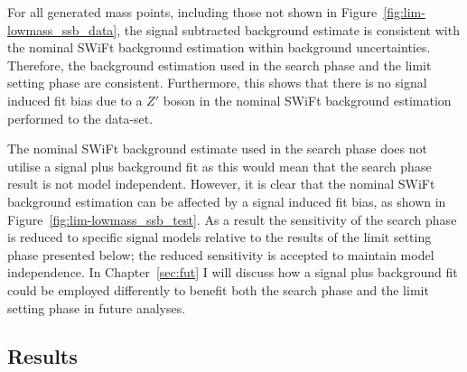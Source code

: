 For all generated mass points, including those not shown in Figure~\ref{fig:lim-lowmass_ssb_data},
the signal subtracted background estimate is consistent with the nominal SWiFt background estimation
within background uncertainties.
Therefore, the background estimation used in the search phase and the limit setting phase are consistent.
Furthermore, this shows that there is no signal induced fit bias due to a $Z'$ boson
in the nominal SWiFt background estimation performed to the \lm{} data-set.


The nominal SWiFt background estimate used in the search phase
does not utilise a signal plus background fit
as this would mean that the search phase result is not model independent.
However, it is clear that the nominal SWiFt background estimation can be affected by a signal induced fit bias,
as shown in Figure~\ref{fig:lim-lowmass_ssb_test}.
As a result the sensitivity of the search phase is reduced to specific signal models relative to the results of the limit setting phase presented below;
the reduced sensitivity is accepted to maintain model independence.
In Chapter~\ref{sec:fut} I will discuss how a signal plus background fit
could be employed differently to benefit both the search phase and the limit setting phase in future analyses.

\subsection{Results}
\label{sec:lim-full_results}

